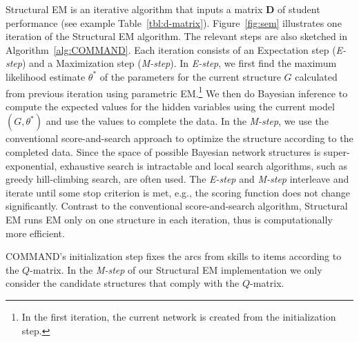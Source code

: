 \documentclass{edm_template}
\begin{document}
Structural EM is an iterative algorithm that  inputs a matrix $\mathbf{D}$ of student performance (see example Table~\ref{tbl:d-matrix}). %
Figure~\ref{fig:sem} illustrates one iteration of the Structural EM algorithm. The relevant steps are also sketched in Algorithm~\ref{alg:COMMAND}. 
Each iteration consists of an Expectation step (\emph{E-step}) and a Maximization step (\emph{M-step}). 
In \emph{E-step}, we first find the maximum likelihood estimate $\theta^*$ of the parameters 
for the current structure $G$ calculated from previous iteration using parametric EM.\footnote{In the first iteration, the current network is created from the initialization step.}
We then do Bayesian inference to compute the expected values for the hidden variables using the current model $(G,\theta^*)$
and use the values to complete the data.
In the \emph{M-step}, we use the conventional score-and-search approach to optimize the structure according to the completed data.
Since the space of possible Bayesian network structures is super-exponential, 
exhaustive search is intractable and local search algorithms, such as greedy hill-climbing search, are often used.
The \emph{E-step} and \emph{M-step} interleave and iterate until some stop criterion is met, e.g., the scoring function does not change significantly.
Contrast to the conventional score-and-search algorithm, Structural EM runs EM only on one structure in each iteration, thus is computationally more efficient.

COMMAND's  initialization step
fixes the arcs from skills to items according to the ${Q}$-matrix.
In  the \emph{M-step} of our Structural EM implementation we only consider the candidate structures that comply with the ${Q}$-matrix.
\end{document}
